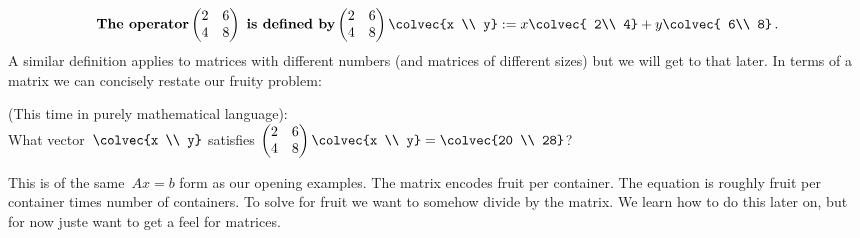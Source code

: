 \begin{equation*}
 \textbf{The~operator}   \begin{pmatrix}
      2     & 6 \\
      4     & 8
    \end{pmatrix}~\text{\bfseries is~defined~by}
    \begin{pmatrix}
      2     & 6 \\
      4     & 8
    \end{pmatrix}
  \colvec{x \\ y}
  := x \colvec{ 2\\ 4} + y \colvec{ 6\\ 8} \, .
\end{equation*}
A similar definition applies to matrices with different numbers (and matrices of different sizes) but we will get to that later. 
In terms of a matrix we can concisely restate our fruity problem:
\begin{example}  (This time in purely mathematical language): \\[.2cm]
What vector~$  \colvec{x \\ y}$ satisfies 
$
    \begin{pmatrix}
      2     & 6 \\
      4     & 8
    \end{pmatrix}
  \colvec{x \\ y}
  =   \colvec{20 \\ 28}
$?
\end{example}
This is of the same~$Ax=b$ form as our opening examples. 
The matrix encodes fruit per container. The equation is roughly fruit per container times number of containers. To solve for fruit we want to \hypertarget{ch1divide}{somehow divide} by the matrix. We learn how to do this later on, but for now juste want to get a feel for matrices.


